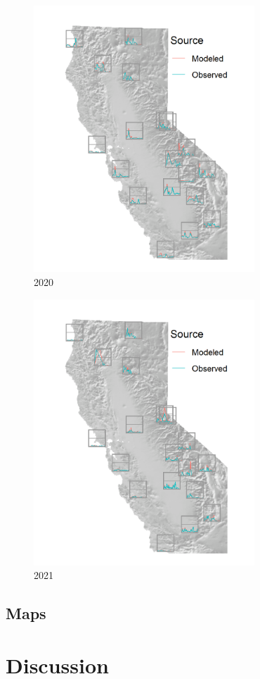 \documentclass[gmd, manuscript]{copernicus}
\begin{document}
\begin{figure}
\includegraphics[width=8.3cm]{./Figures/Spark2020_GMD} \caption{2020}\label{fig:unnamed-chunk-8}
\end{figure}

\begin{figure}
\includegraphics[width=8.3cm]{./Figures/Spark2021_GMD} \caption{2021}\label{fig:unnamed-chunk-9}
\end{figure}

\subsection{Maps}

\section{Discussion}
\end{document}
